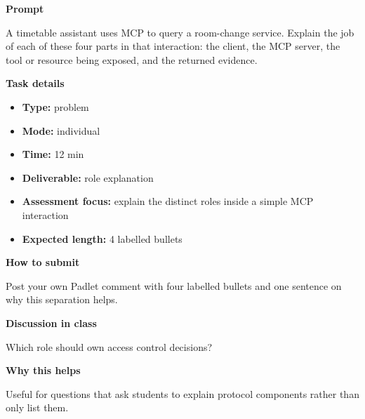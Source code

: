 \documentclass[11pt]{article}
\begin{document}
\begin{tcolorbox}[colback=white,colframe=MidnightBlue,title={Q3 Structured Problem},fonttitle=\bfseries,breakable]
\begin{center}
\end{center}

{\large\bfseries\color{MidnightBlue} Prompt}\par\medskip
A timetable assistant uses MCP to query a room-change service. Explain the job of each of these four parts in that interaction: the client, the MCP server, the tool or resource being exposed, and the returned evidence.

{\large\bfseries\color{MidnightBlue} Task details}\par\medskip
\begin{itemize}\item \textbf{Type:} problem
\item \textbf{Mode:} individual
\item \textbf{Time:} 12 min
\item \textbf{Deliverable:} role explanation
\item \textbf{Assessment focus:} explain the distinct roles inside a simple MCP interaction
\item \textbf{Expected length:} 4 labelled bullets\end{itemize}

{\large\bfseries\color{MidnightBlue} How to submit}\par\medskip
Post your own Padlet comment with four labelled bullets and one sentence on why this separation helps.

{\large\bfseries\color{MidnightBlue} Discussion in class}\par\medskip
Which role should own access control decisions?

{\large\bfseries\color{MidnightBlue} Why this helps}\par\medskip
Useful for questions that ask students to explain protocol components rather than only list them.


\end{tcolorbox}
\end{document}
